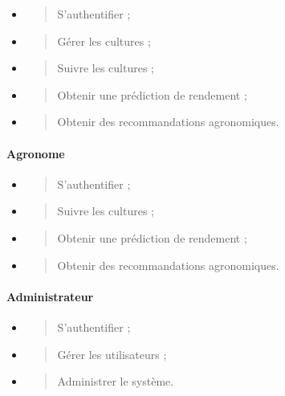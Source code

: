 \documentclass[
]{article}
\begin{document}
\begin{itemize}
\item
  \begin{quote}
  S'authentifier ;
  \end{quote}
\item
  \begin{quote}
  Gérer les cultures ;
  \end{quote}
\item
  \begin{quote}
  Suivre les cultures ;
  \end{quote}
\item
  \begin{quote}
  Obtenir une prédiction de rendement ;
  \end{quote}
\item
  \begin{quote}
  Obtenir des recommandations agronomiques.
  \end{quote}
\end{itemize}

\hypertarget{agronome-1}{%
\paragraph{Agronome}\label{agronome-1}}

\begin{itemize}
\item
  \begin{quote}
  S'authentifier ;
  \end{quote}
\item
  \begin{quote}
  Suivre les cultures ;
  \end{quote}
\item
  \begin{quote}
  Obtenir une prédiction de rendement ;
  \end{quote}
\item
  \begin{quote}
  Obtenir des recommandations agronomiques.
  \end{quote}
\end{itemize}

\hypertarget{administrateur-1}{%
\paragraph{Administrateur}\label{administrateur-1}}

\begin{itemize}
\item
  \begin{quote}
  S'authentifier ;
  \end{quote}
\item
  \begin{quote}
  Gérer les utilisateurs ;
  \end{quote}
\item
  \begin{quote}
  Administrer le système.
  \end{quote}
\end{itemize}
\end{document}
